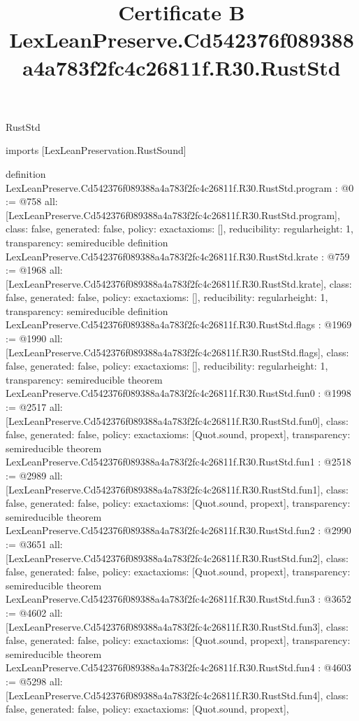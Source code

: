 \begin{lexlean}{RustStd}
\title{Certificate B LexLeanPreserve.Cd542376f089388a4a783f2fc4c26811f.R30.RustStd}
\begin{coremodule}
imports [LexLeanPreservation.RustSound]

definition LexLeanPreserve.Cd542376f089388a4a783f2fc4c26811f.R30.RustStd.program : @0 := @758 {
  all: [LexLeanPreserve.Cd542376f089388a4a783f2fc4c26811f.R30.RustStd.program],
  class: false,
  generated: false,
  policy: exact{axioms: []},
  reducibility: regular{height: 1},
  transparency: semireducible
}
definition LexLeanPreserve.Cd542376f089388a4a783f2fc4c26811f.R30.RustStd.krate : @759 := @1968 {
  all: [LexLeanPreserve.Cd542376f089388a4a783f2fc4c26811f.R30.RustStd.krate],
  class: false,
  generated: false,
  policy: exact{axioms: []},
  reducibility: regular{height: 1},
  transparency: semireducible
}
definition LexLeanPreserve.Cd542376f089388a4a783f2fc4c26811f.R30.RustStd.flags : @1969 := @1990 {
  all: [LexLeanPreserve.Cd542376f089388a4a783f2fc4c26811f.R30.RustStd.flags],
  class: false,
  generated: false,
  policy: exact{axioms: []},
  reducibility: regular{height: 1},
  transparency: semireducible
}
theorem LexLeanPreserve.Cd542376f089388a4a783f2fc4c26811f.R30.RustStd.fun0 : @1998 := @2517 {
  all: [LexLeanPreserve.Cd542376f089388a4a783f2fc4c26811f.R30.RustStd.fun0],
  class: false,
  generated: false,
  policy: exact{axioms: [Quot.sound, propext]},
  transparency: semireducible
}
theorem LexLeanPreserve.Cd542376f089388a4a783f2fc4c26811f.R30.RustStd.fun1 : @2518 := @2989 {
  all: [LexLeanPreserve.Cd542376f089388a4a783f2fc4c26811f.R30.RustStd.fun1],
  class: false,
  generated: false,
  policy: exact{axioms: [Quot.sound, propext]},
  transparency: semireducible
}
theorem LexLeanPreserve.Cd542376f089388a4a783f2fc4c26811f.R30.RustStd.fun2 : @2990 := @3651 {
  all: [LexLeanPreserve.Cd542376f089388a4a783f2fc4c26811f.R30.RustStd.fun2],
  class: false,
  generated: false,
  policy: exact{axioms: [Quot.sound, propext]},
  transparency: semireducible
}
theorem LexLeanPreserve.Cd542376f089388a4a783f2fc4c26811f.R30.RustStd.fun3 : @3652 := @4602 {
  all: [LexLeanPreserve.Cd542376f089388a4a783f2fc4c26811f.R30.RustStd.fun3],
  class: false,
  generated: false,
  policy: exact{axioms: [Quot.sound, propext]},
  transparency: semireducible
}
theorem LexLeanPreserve.Cd542376f089388a4a783f2fc4c26811f.R30.RustStd.fun4 : @4603 := @5298 {
  all: [LexLeanPreserve.Cd542376f089388a4a783f2fc4c26811f.R30.RustStd.fun4],
  class: false,
  generated: false,
  policy: exact{axioms: [Quot.sound, propext]},
}
\end{coremodule}
\end{lexlean}
